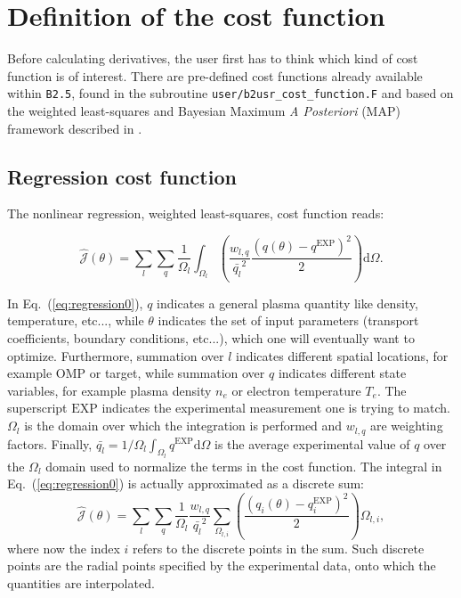 \section{Definition of the cost function}\label{sec:cost_fun}

Before calculating derivatives, the user first has to think which kind of cost function is of interest. There are pre-defined cost functions already available within {\tt B2.5}, found in the subroutine {\tt user/b2usr\_cost\_function.F} and based on the weighted least-squares and Bayesian Maximum {\it A Posteriori} (MAP) framework described in \cite{carlpet21}.

\subsection{Regression cost function}

The nonlinear regression, weighted least-squares, cost function reads:

\begin{equation}\label{eq:regression0}
\hat{\mathcal{J}}(\theta)=\sum_{l} \sum_{q} \frac{1}{\Omega_l} \int_{\Omega_l} \left(\frac{w_{l,q}}{\bar{q_l}^2} \frac{\left(q(\theta) - q^{\mathrm{EXP}}  \right)^2}{2} \right) \mathrm{d}\Omega.
\end{equation}

In Eq.~(\ref{eq:regression0}), $q$ indicates a general plasma quantity like density, temperature, etc..., while $\theta$ indicates the set of input parameters (transport coefficients, boundary conditions, etc...), which one will eventually want to optimize. Furthermore, summation over $l$ indicates different spatial locations, for example OMP or target, while summation over $q$ indicates different state variables, for example plasma density $n_e$ or electron temperature $T_e$. The superscript $\mathrm{EXP}$ indicates the experimental measurement one is trying to match. $\Omega_l$ is the domain over which the integration is performed and $w_{l,q}$ are weighting factors. Finally, $\bar{q_l}=1/\Omega_l\int_{\Omega_l} q^{\mathrm{EXP}}\mathrm{d}\Omega$ is the average experimental value of $q$ over the $\Omega_l$ domain used to normalize the terms in the cost function. The integral in Eq.~(\ref{eq:regression0}) is actually approximated as a discrete sum:
\begin{equation}\label{eq:regression}
\hat{\mathcal{J}}(\theta)=\sum_{l} \sum_{q} \frac{1}{\Omega_l} \frac{w_{l,q}}{\bar{q_l}^2} \sum_{\Omega_{l,i}} \left( \frac{\left(q_i(\theta) - q_i^{\mathrm{EXP}}  \right)^2}{2} \right) \Omega_{l,i},
\end{equation}
where now the index $i$ refers to the discrete points in the sum. Such discrete points are the radial points specified by the experimental data, onto which the \SOLPSITER quantities are interpolated.

